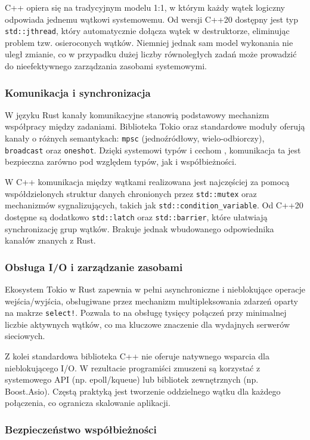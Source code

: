 C++ opiera się na tradycyjnym modelu 1:1, w którym każdy wątek logiczny odpowiada jednemu wątkowi systemowemu. Od wersji C++20 dostępny jest typ \texttt{std::jthread}, który automatycznie dołącza wątek w destruktorze, eliminując problem tzw. osieroconych wątków. Niemniej jednak sam model wykonania nie uległ zmianie, co w przypadku dużej liczby równoległych zadań może prowadzić do nieefektywnego zarządzania zasobami systemowymi.

\subsubsection{Komunikacja i synchronizacja}

W języku Rust kanały komunikacyjne stanowią podstawowy mechanizm współpracy między zadaniami. Biblioteka Tokio oraz standardowe moduły oferują kanały o różnych semantykach: \texttt{mpsc} (jednoźródłowy, wielo-odbiorczy), \texttt{broadcast} oraz \texttt{oneshot}. Dzięki systemowi typów i cechom , komunikacja ta jest bezpieczna zarówno pod względem typów, jak i współbieżności.

W C++ komunikacja między wątkami realizowana jest najczęściej za pomocą współdzielonych struktur danych chronionych przez \texttt{std::mutex} oraz mechanizmów sygnalizujących, takich jak \texttt{std::condition\_variable}. Od C++20 dostępne są dodatkowo \texttt{std::latch} oraz \texttt{std::barrier}, które ułatwiają synchronizację grup wątków. Brakuje jednak wbudowanego odpowiednika kanałów znanych z Rust.

\subsubsection{Obsługa I/O i zarządzanie zasobami}

Ekosystem Tokio w Rust zapewnia w pełni asynchroniczne i nieblokujące operacje wejścia/wyjścia, obsługiwane przez mechanizm multipleksowania zdarzeń oparty na makrze \texttt{select!}. Pozwala to na obsługę tysięcy połączeń przy minimalnej liczbie aktywnych wątków, co ma kluczowe znaczenie dla wydajnych serwerów sieciowych.

Z kolei standardowa biblioteka C++ nie oferuje natywnego wsparcia dla nieblokującego I/O. W rezultacie programiści zmuszeni są korzystać z systemowego API (np. epoll/kqueue) lub bibliotek zewnętrznych (np. Boost.Asio). Częstą praktyką jest tworzenie oddzielnego wątku dla każdego połączenia, co ogranicza skalowanie aplikacji.

\subsubsection{Bezpieczeństwo współbieżności}

